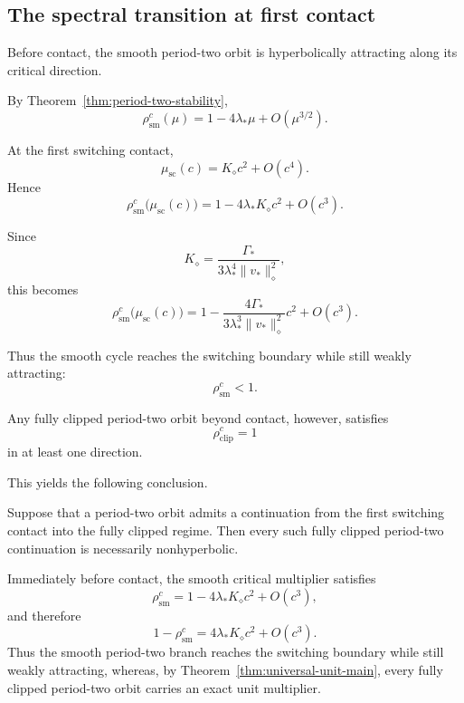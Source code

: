\subsection{The spectral transition at first contact}
\label{subsec:spectral-transition}

Before contact, the smooth period-two orbit is hyperbolically
attracting along its critical direction.

By Theorem~\ref{thm:period-two-stability},
\begin{equation}
\rho_{\mathrm{sm}}^c(\mu)
=
1
-
4\lambda_*\mu
+
O(\mu^{3/2}).
\label{eq:precontact-critical-multiplier}
\end{equation}

At the first switching contact,
\begin{equation}
\mu_{\mathrm{sc}}(c)
=
K_\diamond c^2
+
O(c^4).
\label{eq:contact-mu-main}
\end{equation}
Hence
\begin{equation}
\rho_{\mathrm{sm}}^c
\bigl(
\mu_{\mathrm{sc}}(c)
\bigr)
=
1
-
4\lambda_*K_\diamond c^2
+
O(c^3).
\label{eq:contact-smooth-multiplier}
\end{equation}

Since
\[
K_\diamond
=
\frac{
\Gamma_*
}{
3\lambda_*^4
\|v_*\|_\diamond^2
},
\]
this becomes
\begin{equation}
\rho_{\mathrm{sm}}^c
\bigl(
\mu_{\mathrm{sc}}(c)
\bigr)
=
1
-
\frac{
4\Gamma_*
}{
3\lambda_*^3
\|v_*\|_\diamond^2
}
c^2
+
O(c^3).
\label{eq:contact-smooth-multiplier-Gamma}
\end{equation}

Thus the smooth cycle reaches the switching boundary while still
weakly attracting:
\[
\rho_{\mathrm{sm}}^c<1.
\]

Any fully clipped period-two orbit beyond contact, however, satisfies
\[
\rho_{\mathrm{clip}}^c=1
\]
in at least one direction.

This yields the following conclusion.

\begin{corollary}
\label{cor:loss-hyperbolicity-clipping}

Suppose that a period-two orbit admits a continuation from the
first switching contact into the fully clipped regime.
Then every such fully clipped period-two continuation is
necessarily nonhyperbolic.

Immediately before contact, the smooth critical multiplier satisfies
\[
\rho_{\mathrm{sm}}^c
=
1-4\lambda_*K_\diamond c^2+O(c^3),
\]
and therefore
\[
1-\rho_{\mathrm{sm}}^c
=
4\lambda_*K_\diamond c^2+O(c^3).
\]
Thus the smooth period-two branch reaches the switching boundary
while still weakly attracting, whereas, by
Theorem~\ref{thm:universal-unit-main}, every fully clipped
period-two orbit carries an exact unit multiplier.
\end{corollary}

